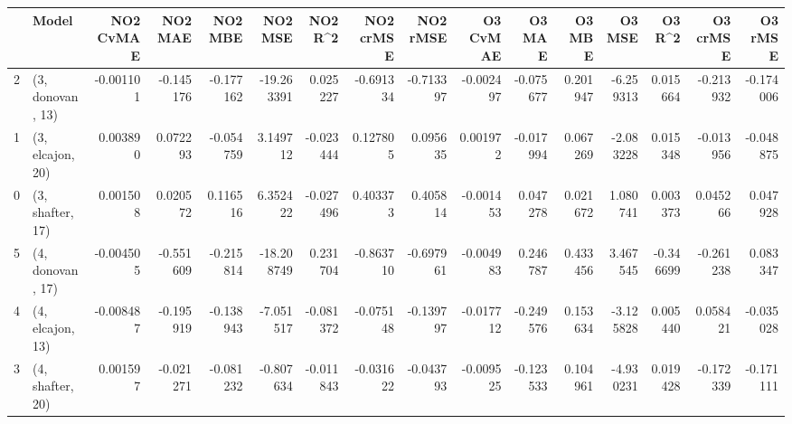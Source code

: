 \begin{tabular}{llrrrrrrrrrrrrrr}
\toprule
{} &             Model &  NO2 CvMAE &   NO2 MAE &   NO2 MBE &    NO2 MSE &   NO2 R\textasciicircum2 &  NO2 crMSE &  NO2 rMSE &  O3 CvMAE &    O3 MAE &    O3 MBE &    O3 MSE &    O3 R\textasciicircum2 &  O3 crMSE &   O3 rMSE \\
\midrule
2 &  (3, donovan, 13) &  -0.001101 & -0.145176 & -0.177162 & -19.263391 &  0.025227 &  -0.691334 & -0.713397 & -0.002497 & -0.075677 &  0.201947 & -6.259313 &  0.015664 & -0.213932 & -0.174006 \\
1 &  (3, elcajon, 20) &   0.003890 &  0.072293 & -0.054759 &   3.149712 & -0.023444 &   0.127805 &  0.095635 &  0.001972 & -0.017994 &  0.067269 & -2.083228 &  0.015348 & -0.013956 & -0.048875 \\
0 &  (3, shafter, 17) &   0.001508 &  0.020572 &  0.116516 &   6.352422 & -0.027496 &   0.403373 &  0.405814 & -0.001453 &  0.047278 &  0.021672 &  1.080741 &  0.003373 &  0.045266 &  0.047928 \\
5 &  (4, donovan, 17) &  -0.004505 & -0.551609 & -0.215814 & -18.208749 &  0.231704 &  -0.863710 & -0.697961 & -0.004983 &  0.246787 &  0.433456 &  3.467545 & -0.346699 & -0.261238 &  0.083347 \\
4 &  (4, elcajon, 13) &  -0.008487 & -0.195919 & -0.138943 &  -7.051517 & -0.081372 &  -0.075148 & -0.139797 & -0.017712 & -0.249576 &  0.153634 & -3.125828 &  0.005440 &  0.058421 & -0.035028 \\
3 &  (4, shafter, 20) &   0.001597 & -0.021271 & -0.081232 &  -0.807634 & -0.011843 &  -0.031622 & -0.043793 & -0.009525 & -0.123533 &  0.104961 & -4.930231 &  0.019428 & -0.172339 & -0.171111 \\
\bottomrule
\end{tabular}
